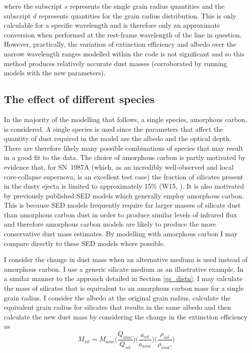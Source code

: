 where the subscript $s$ represents the single grain radius quantities and the subscript  $d$ represents quantities for the grain radius distribution.  This is only calculable for a specific wavelength and is therefore only an approximate conversion when performed at the rest-frame wavelength of the line in question.  However, practically, the variation of extinction efficiency and albedo over the narrow wavelength ranges modelled within the code is not significant and so this method produces relatively accurate dust masses (corroborated by running models with the new parameters).

\subsection{The effect of different species}
In the majority of the modelling that follows, a single species, amorphous carbon, is considered.   A single species is used since the parameters that affect the quantity of dust required in the model are the albedo and the optical depth.  There are therefore  likely many possible combinations of species that may result in a good fit to the data.  The choice of amorphous carbon is partly motivated by evidence that, for SN~1987A (which, as an incredibly well-observed and local core-collapse supernova, is an excellent test case) the fraction of silicates present in the dusty ejecta is limited to approximately 15\% (W15, \citet{Ercolano2007}).  It is also motivated by previously published SED models which generally employ amorphous carbon.  This is because SED models frequently require far larger masses of silicate dust than amorphous carbon dust in order to produce similar levels of infrared flux and therefore amorphous carbon models are likely to produce the more conservative dust mass estimates.  By modelling with amorphous carbon I may compare directly to these SED models where possible.

I consider the change in dust mass when an alternative medium is used instead of amorphous carbon.  I use a generic silicate medium as an illustrative example.
 In a similar manner to the approach detailed in Section \ref{gs_distn}, I may calculate the mass of silicates that is equivalent to an amorphous carbon mass for a single grain radius.  I consider the albedo at the original grain radius, calculate the equivalent grain radius for silicates that results in the same albedo and then calculate the new dust mass by considering the change in the extinction efficiency as
\begin{equation}
\label{species_conversion}
M_{sil} = M_{amc} \Big( \frac{Q_{amc}}{Q_{sil}} \Big) \Big(\frac{a_{sil}}{a_{amc}}\Big) \Big(\frac{\rho_{sil}}{\rho_{amC}}\Big)
\end{equation}

